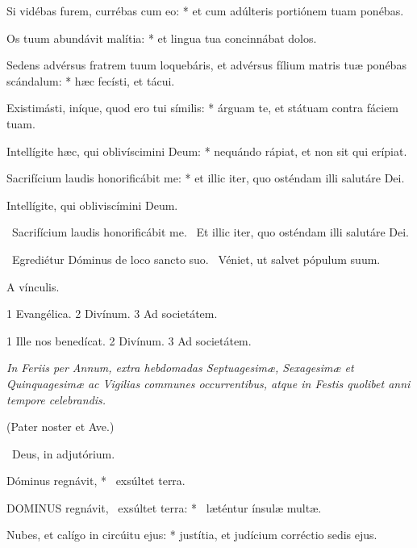 Si vidébas furem, currébas cum eo: * et cum adúlteris portiónem tuam ponébas.

Os tuum abundávit malítia: * et lingua tua concinnábat dolos.

Sedens advérsus fratrem tuum loquebáris, et advérsus fílium matris tuæ ponébas scándalum: * hæc fecísti, et tácui.

Existimásti, iníque, quod ero tui símilis: * árguam te, et státuam contra fáciem tuam.

Intellígite hæc, qui oblivíscimini Deum: * nequándo rápiat, et non sit qui erípiat.

Sacrifícium laudis honorificábit me: * et illic iter, quo osténdam illi salutáre Dei.

 Intellígite, qui obliviscímini Deum.


\V\ Sacrifícium laudis honorificábit me. \R\ Et illic iter, quo osténdam illi salutáre Dei.


\V\ Egrediétur Dóminus de loco sancto suo. \R\ Véniet, ut salvet pópulum suum.

 A vínculis.


 1 Evangélica. 2 Divínum. 3 Ad societátem.


 1 Ille nos benedícat. 2 Divínum. 3 Ad societátem.

\sectionornament


\textit{In Feriis per Annum, extra hebdomadas Septuagesimæ, Sexagesimæ et Quinquagesimæ ac Vigilias communes occurrentibus, atque in Festis quolibet anni tempore celebrandis.}

(Pater noster et Ave.)

\V\ Deus, in adjutórium.

 Dóminus regnávit, * \textdagger\ exsúltet terra. \textdaggerdbl


\lettrine[lines=2]{D}{OMINUS} regnávit, \textdagger\ exsúltet terra: * \textdaggerdbl\ læténtur ínsulæ multæ.

Nubes, et calígo in circúitu ejus: * justítia, et judícium corréctio sedis ejus.

